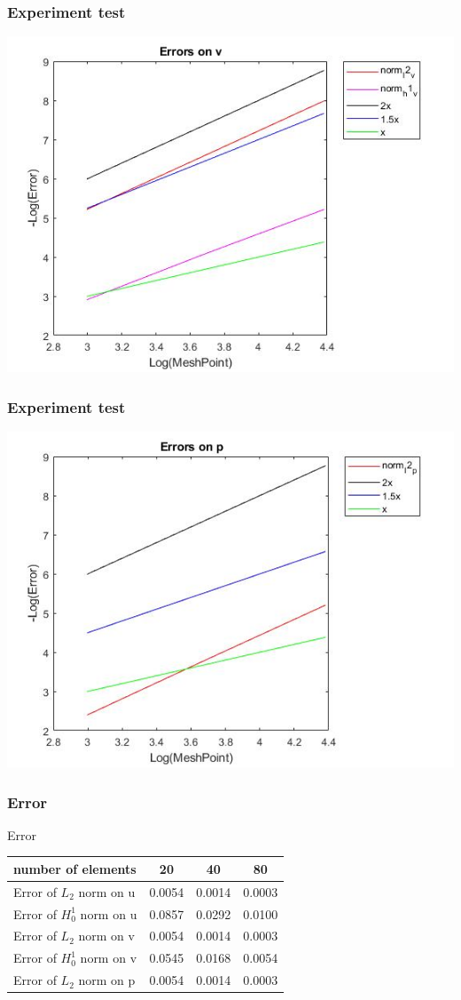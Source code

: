 \documentclass[11pt]{beamer}
\numberwithin{equation}{section}
\theoremstyle{plain}
\theoremstyle{definition}
\theoremstyle{remark}
\begin{document}
\begin{frame}\frametitle{Experiment test}
\includegraphics[scale=0.5]{8}
\end{frame}
\begin{frame}\frametitle{Experiment test}
\includegraphics[scale=0.5]{9}
\end{frame}
\begin{frame}\frametitle{Error}
\begin{block}{Error}
\begin{tabular}{|l||c||c||c|}
\hline 
number of elements  & 20 & 40 & 80  \\ 
\hline 
Error of $L_2$ norm on u  & 0.0054  &0.0014 & 0.0003  \\
\hline
Error of $H_0^1$ norm on u  & 0.0857 & 0.0292 & 0.0100  \\
\hline
Error of $L_2$ norm on v  & 0.0054  &0.0014 & 0.0003  \\
\hline
Error of $H_0^1$ norm on v  & 0.0545 & 0.0168 & 0.0054  \\
\hline
Error of $L_2$ norm on p  & 0.0054  &0.0014 & 0.0003  \\
\hline
\end{tabular}
\end{block}
\end{frame}
\end{document}

